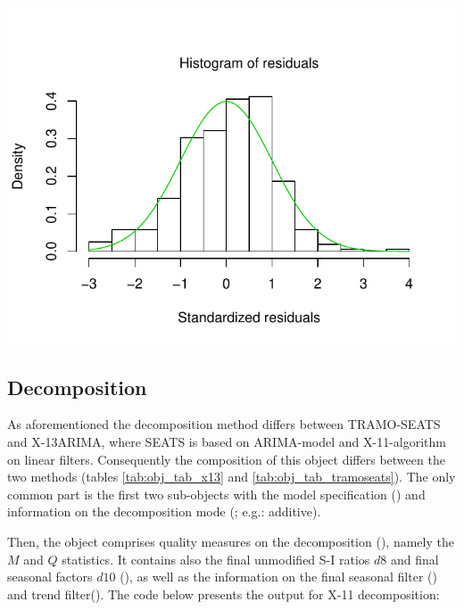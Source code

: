 \documentclass[article]{jss}
\begin{document}
\begin{CodeChunk}


\begin{center}\includegraphics{img/img-unnamed-chunk-6-1} \end{center}

\end{CodeChunk}

\hypertarget{decomposition}{%
\subsection{Decomposition}\label{decomposition}}

As aforementioned the decomposition method differs between TRAMO-SEATS
and X-13ARIMA, where SEATS is based on ARIMA-model and X-11-algorithm on
linear filters. Consequently the composition of this object differs
between the two methods (tables \ref{tab:obj_tab_x13} and
\ref{tab:obj_tab_tramoseats}). The only common part is the first two
sub-objects with the model specification () and
information on the decomposition mode (; e.g.: additive).

Then, the  object comprises quality measures on
the decomposition (), namely the \(M\) and \(Q\)
statistics. It contains also the final unmodified S-I ratios \(d8\) and
final seasonal factors \(d10\) (), as well as the
information on the final seasonal filter () and trend
filter(). The code below presents the output for X-11
decomposition:
\end{document}
